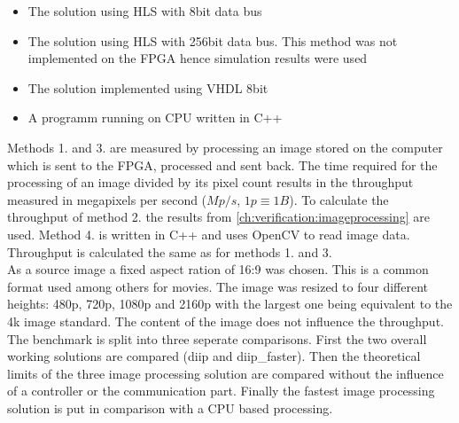 \begin{itemize}
    \item The solution using HLS with 8bit data bus
    \item The solution using HLS with 256bit data bus. This method was not
    implemented on the FPGA hence simulation results were used
    \item The solution implemented using VHDL 8bit
    \item A programm running on CPU written in C++
\end{itemize}

Methods 1. and 3. are measured by processing an image stored on the computer
which is sent to the FPGA, processed and sent back. The time required for the
processing of an image divided by its pixel count results in the throughput
measured in megapixels per second ($Mp/s$, $1p\equiv1B$). To calculate the
throughput of
method 2. the results from \ref{ch:verification:imageprocessing} are used.
Method
4. is written in C++ and uses OpenCV to read image data. Throughput is
calculated the same as for methods 1. and 3.
\\

As a source image a fixed aspect ration of 16:9 was chosen. This is a common
format used among others for movies. The image was resized to four different
heights: 480p, 720p, 1080p and 2160p with the largest one being equivalent to
the
4k image standard. The content of the image does not influence the throughput.
\\

The benchmark is split into three seperate comparisons. First the two overall
working solutions are compared (diip and diip\_faster). Then the theoretical
limits of the three image processing solution are compared without the influence
of a controller or the communication part. Finally the fastest image processing
solution is put in comparison with a CPU based processing.

